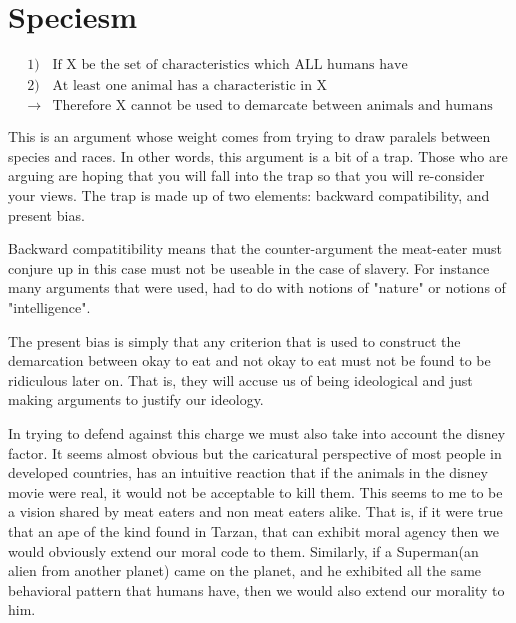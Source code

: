 \section{Speciesm}


\begin{tcolorbox}[enhanced,%
  colback=green!25!black!10!white,colframe=green!75!black,title=Fit box (5cm),
  drop fuzzy shadow,watermark color=white,watermark text=Fit]
\begin{align*}
1)& \text{If X be the set of characteristics which ALL humans have} \\
2)& \text{At least one animal has a characteristic in X} \\
\rightarrow& \text{Therefore X cannot be used to demarcate between animals and humans}
\end{align*}
\end{tcolorbox}


This is an argument whose weight comes from trying to draw paralels between species and races. In other words, this argument is a bit of a trap. Those who are arguing are hoping that you will fall into the trap so that you will re-consider your views. The trap is made up of two elements: backward compatibility, and present bias. 

Backward compatitibility means that the counter-argument the meat-eater must conjure up in this case must not be useable in the case of slavery. For instance many arguments that were used, had to do with notions of "nature" or notions of "intelligence".

The present bias is simply that any criterion that is used to construct the demarcation between okay to eat and not okay to eat must not be found to be ridiculous later on. That is, they will accuse us of being ideological and just making arguments to justify our ideology. 

In trying to defend against this charge we must also take into account the disney factor. It seems almost obvious but the caricatural perspective of most people in developed countries, has an intuitive reaction that if the animals in the disney movie were real, it would not be acceptable to kill them. This seems to me to be a vision shared by meat eaters and non meat eaters alike. That is, if it were true that an ape of the kind found in Tarzan, that can exhibit moral agency then we would obviously extend our moral code to them. Similarly, if a Superman(an alien from another planet) came on the planet, and he exhibited all the same behavioral pattern that humans have, then we would also extend our morality to him. 

